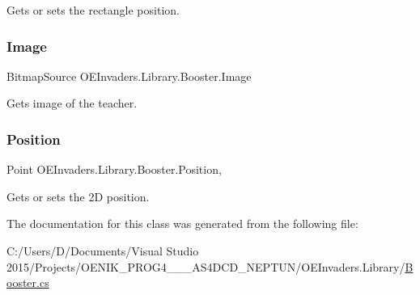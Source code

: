 Gets or sets the rectangle position. 

\mbox{\label{class_o_e_invaders_1_1_library_1_1_booster_a3ef872db16bb7e09e48df7032c01e595}} 
\subsubsection{\texorpdfstring{Image}{Image}}
{\footnotesize\ttfamily Bitmap\+Source O\+E\+Invaders.\+Library.\+Booster.\+Image\hspace{0.3cm}{\ttfamily [get]}}



Gets image of the teacher. 

\mbox{\label{class_o_e_invaders_1_1_library_1_1_booster_a9651a55313c6b78aacbccd827c73cb2c}} 
\subsubsection{\texorpdfstring{Position}{Position}}
{\footnotesize\ttfamily Point O\+E\+Invaders.\+Library.\+Booster.\+Position\hspace{0.3cm}{\ttfamily [get]}, {\ttfamily [set]}}



Gets or sets the 2D position. 



The documentation for this class was generated from the following file\+:\begin{DoxyCompactItemize}
\item 
C\+:/\+Users/\+D/\+Documents/\+Visual Studio 2015/\+Projects/\+O\+E\+N\+I\+K\+\_\+\+P\+R\+O\+G4\+\_\+\_\+\_\+\+A\+S4\+D\+C\+D\+\_\+\+N\+E\+P\+T\+U\+N/\+O\+E\+Invaders.\+Library/\mbox{\hyperlink{_booster_8cs}{Booster.\+cs}}\end{DoxyCompactItemize}

